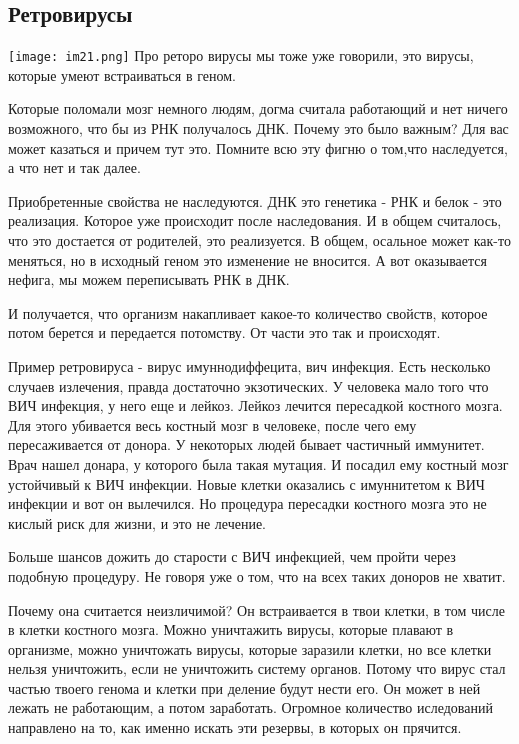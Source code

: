 \subsection{Ретровирусы}
\texttt{[image: im21.png]}
Про реторо вирусы мы тоже уже говорили, это вирусы, которые 
умеют встраиваться в геном. 

Которые поломали мозг немного людям, догма считала работающий и 
нет ничего возможного, что бы из РНК получалось ДНК. 
Почему это было важным? Для вас может казаться и причем тут это. 
Помните всю эту фигню о том,что наследуется, а что нет и так далее. 

Приобретенные свойства не наследуются. ДНК это генетика - РНК и белок - это 
реализация. Которое уже происходит после наследования. И в общем считалось, что 
это достается от родителей, это реализуется. В общем, осальное может как-то меняться, 
но в исходный геном это изменение не вносится. А вот оказывается нефига, 
мы можем переписывать РНК в ДНК. 

И получается, что организм накапливает какое-то количество свойств, 
которое потом берется и передается потомству. От части это так и происходят. 


Пример ретровируса - вирус имуннодиффецита, вич инфекция. Есть несколько 
случаев излечения, правда достаточно экзотических. У человека мало того что
ВИЧ инфекция, у него еще и лейкоз. Лейкоз лечится пересадкой костного мозга.
Для этого убивается весь костный мозг в человеке,
после чего ему пересаживается от донора. У некоторых
людей бывает частичный иммунитет. Врач нашел донара, у которого была такая
мутация. И посадил ему костный мозг устойчивый к ВИЧ инфекции. Новые клетки
оказались с имуннитетом к ВИЧ инфекции и вот он вылечился. Но процедура
пересадки костного мозга это не кислый риск для жизни, и это не лечение.

Больше шансов дожить до старости с ВИЧ инфекцией, чем пройти через подобную процедуру.
Не говоря уже о том, что на всех таких доноров не хватит.

Почему она считается неизличимой? Он встраивается в твои клетки, в том
числе в клетки костного мозга. Можно уничтажить вирусы, которые плавают в организме,
можно уничтожать вирусы, которые заразили клетки, но все клетки нельзя уничтожить,
если не уничтожить систему органов. Потому что вирус стал частью твоего генома и
клетки при деление будут нести его. Он может в ней лежать не работающим,
а потом заработать. Огромное количество иследований направлено на то,
как именно искать эти резервы, в которых он прячится.

